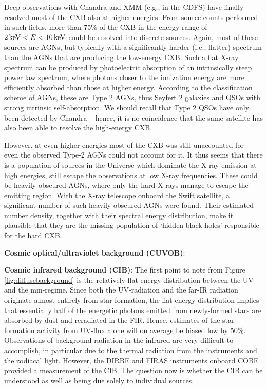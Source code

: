 \documentclass[a4paper,11pt]{article}
\begin{document}
{\noindent}Deep observations with Chandra and XMM (e.g., in the CDFS) have finally resolved most of the CXB also at higher energies. From source counts performed in such fields, more than 75\% of the CXB in the energy range of $2\,{\rm keV}<E<10\,{\rm keV}$ could be resolved into discrete sources. Again, most of these sources are AGNs, but typically with a significantly harder (i.e., flatter) spectrum than the AGNs that are producing the low-energy CXB. Such a flat X-ray spectrum can be produced by photoelectric absorption of an intrinsically steep power law spectrum, where photons closer to the ionization energy are more efficiently absorbed than those at higher energy. According to the classification scheme of AGNs, these are Type 2 AGNs, thus Seyfert 2 galaxies and QSOs with strong intrinsic self-absorption. We should recall that Type 2 QSOs have only been detected by Chandra -- hence, it is no coincidence that the same satellite has also been able to resolve the high-energy CXB.

{\noindent}However, at even higher energies most of the CXB was still unaccounted for -- even the observed Type-2 AGNs could not account for it. It thus seems that there is a population of sources in the Universe which dominate the X-ray emission at high energies, still escape the observations at low X-ray frequencies. These could be heavily obscured AGNs, where only the hard X-rays manage to escape the emitting region. With the X-ray telescope onboard the Swift satellite, a significant number of such heavily obscured AGNs were found. Their estimated number density, together with their spectral energy distribution, make it plausible that they are the missing population of `hidden black holes' responsible for the hard CXB.

{\noindent}\textbf{Cosmic optical/ultraviolet background (CUVOB)}: 

{\noindent}\textbf{Cosmic infrared background (CIB)}: The first point to note from Figure \ref{fig:diffusebackground} is the relatively flat energy distribution between the UV- and the mm-regime. Since both the UV-radiation and the far-IR radiation originate almost entirely from star-formation, the flat energy distribution implies that essentially half of the energetic photons emitted from newly-formed stars are absorbed by dust and reradiated in the FIR. Hence, estimates of the star formation activity from UV-flux alone will on average be biased low by 50\%. Observations of background radiation in the infrared are very difficult to accomplish, in particular due to the thermal radiation from the instruments and the zodiacal light. However, the DIRBE and FIRAS instruments onboard COBE provided a measurement of the CIB. The question now is whether the CIB can be understood as well as being due solely to individual sources.
\end{document}
